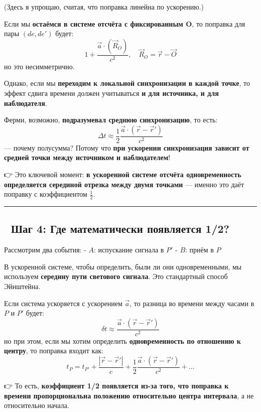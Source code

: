 \documentclass[11pt]{article}
\begin{document}
(Здесь я упрощаю, считая, что поправка линейна по ускорению.)

Если мы \textbf{остаёмся в системе отсчёта с фиксированным O}, то
поправка для пары \((de, de')\) будет: \[
1 + \frac{\vec{a} \cdot (\vec{R}_O)}{c^2}, \quad \vec{R}_O = \vec{r} - \vec{O}
\] но это несимметрично.

Однако, если мы \textbf{переходим к локальной синхронизации в каждой
точке}, то эффект сдвига времени должен учитываться \textbf{и для
источника, и для наблюдателя}.

Ферми, возможно, \textbf{подразумевал среднюю синхронизацию}, то есть:
\[
\Delta t \approx \frac{1}{2} \frac{\vec{a} \cdot (\vec{r} - \vec{r}')}{c^2}
\] --- почему полусумма? Потому что \textbf{при ускорении синхронизация
зависит от средней точки между источником и наблюдателем}!

👉 Это ключевой момент: \textbf{в ускоренной системе отсчёта
одновременность определяется серединой отрезка между двумя точками} ---
именно это даёт поправку с коэффициентом \(\frac{1}{2}\).

\begin{center}\rule{0.5\linewidth}{\linethickness}\end{center}

\subsection{📌 Шаг 4: Где математически появляется
1/2?}\label{ux448ux430ux433-4-ux433ux434ux435-ux43cux430ux442ux435ux43cux430ux442ux438ux447ux435ux441ux43aux438-ux43fux43eux44fux432ux43bux44fux435ux442ux441ux44f-12}

Рассмотрим два события: - \(A\): испускание сигнала в \(P'\) - \(B\):
приём в \(P\)

В ускоренной системе, чтобы определить, были ли они одновременными, мы
используем \textbf{середину пути светового сигнала}. Это стандартный
способ Эйнштейна.

Если система ускоряется с ускорением \(\vec{a}\), то разница во времени
между часами в \(P\) и \(P'\) будет: \[
\delta t \approx \frac{\vec{a} \cdot (\vec{r} - \vec{r}')}{c^2}
\] но при этом, если мы хотим определить \textbf{одновременность по
отношению к центру}, то поправка входит как: \[
t_P = t_{P'} + \frac{|\vec{r}-\vec{r}'|}{c} + \frac{1}{2} \frac{\vec{a} \cdot (\vec{r} - \vec{r}')}{c^2} + \dots
\]

👉 То есть, \textbf{коэффициент 1/2 появляется из-за того, что поправка к
времени пропорциональна положению относительно центра интервала}, а не
относительно начала.
\end{document}
